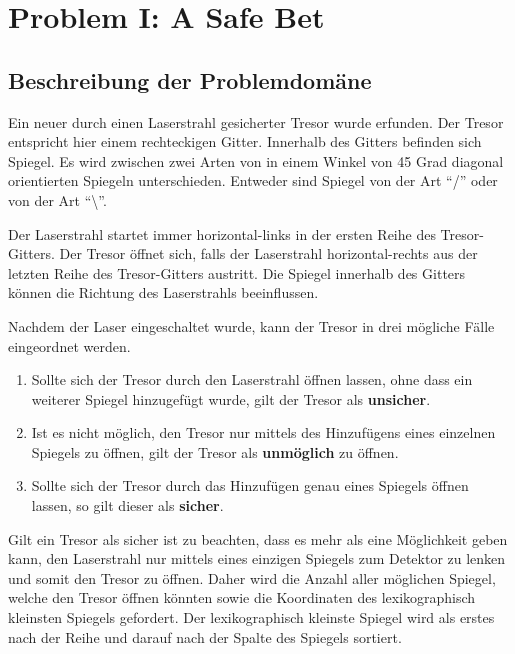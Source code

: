 \newpage
\section{Problem I: A Safe Bet}
\label{sec:Latex}
\subsection{Beschreibung der Problemdomäne}
\label{subsec:DokHeadGli}
Ein neuer durch einen Laserstrahl gesicherter Tresor wurde erfunden. Der Tresor entspricht hier einem rechteckigen Gitter. Innerhalb des Gitters befinden sich Spiegel. Es wird zwischen zwei Arten von in einem Winkel von 45 Grad diagonal orientierten Spiegeln unterschieden. Entweder sind Spiegel von der Art “\slash” oder von der Art “\textbackslash”. 

Der Laserstrahl startet immer horizontal-links in der ersten Reihe des Tresor-Gitters. Der Tresor öffnet sich, falls der Laserstrahl horizontal-rechts aus der letzten Reihe des Tresor-Gitters austritt. Die Spiegel innerhalb des Gitters können die Richtung des Laserstrahls beeinflussen.

Nachdem der Laser eingeschaltet wurde, kann der Tresor in drei mögliche Fälle eingeordnet werden.
\begin{enumerate}
  \item Sollte sich der Tresor durch den Laserstrahl öffnen lassen, ohne dass ein weiterer Spiegel hinzugefügt wurde, gilt der Tresor als \textbf{unsicher}.
  \item Ist es nicht möglich, den Tresor nur mittels des Hinzufügens eines einzelnen Spiegels zu öffnen, gilt der Tresor als \textbf{unmöglich} zu öffnen.
  \item Sollte sich der Tresor durch das Hinzufügen genau eines Spiegels öffnen lassen, so gilt dieser als \textbf{sicher}.
\end{enumerate}
Gilt ein Tresor als sicher ist zu beachten, dass es mehr als eine Möglichkeit geben kann, den Laserstrahl nur mittels eines einzigen Spiegels zum Detektor zu lenken und somit den Tresor zu öffnen. Daher wird die Anzahl aller möglichen Spiegel, welche den Tresor öffnen könnten sowie die Koordinaten des lexikographisch kleinsten Spiegels gefordert. Der lexikographisch kleinste Spiegel wird als erstes nach der Reihe und darauf nach der Spalte des Spiegels sortiert.
%
